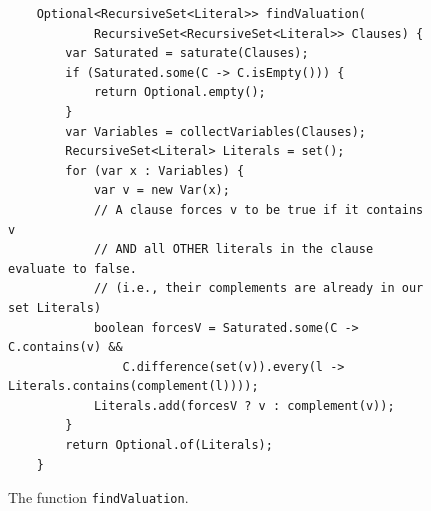 \begin{figure}[!ht]
\centering
\begin{verbatim}
    Optional<RecursiveSet<Literal>> findValuation(
            RecursiveSet<RecursiveSet<Literal>> Clauses) {
        var Saturated = saturate(Clauses);
        if (Saturated.some(C -> C.isEmpty())) {
            return Optional.empty();
        }
        var Variables = collectVariables(Clauses);
        RecursiveSet<Literal> Literals = set();
        for (var x : Variables) {
            var v = new Var(x);
            // A clause forces v to be true if it contains v
            // AND all OTHER literals in the clause evaluate to false.
            // (i.e., their complements are already in our set Literals)
            boolean forcesV = Saturated.some(C -> C.contains(v) &&
                C.difference(set(v)).every(l -> Literals.contains(complement(l))));
            Literals.add(forcesV ? v : complement(v));
        }
        return Optional.of(Literals);
    }
\end{verbatim}
\vspace*{-0.3cm}
\caption{The function \texttt{findValuation}.}
\label{fig:Completeness.ipynb-3}
\end{figure}

\FloatBarrier


